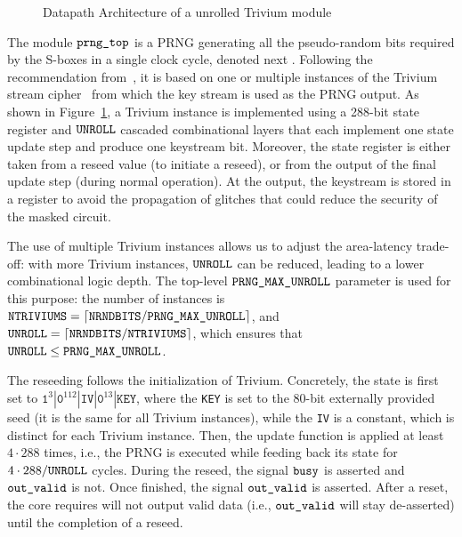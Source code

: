 \documentclass{scrartcl}
\begin{document}
\begin{figure}
    \centering
    \resizebox{\textwidth}{!}{
        \begin{tikzpicture}
            
        \end{tikzpicture}
    }
    \caption{Datapath Architecture of a unrolled Trivium module}
    \label{fig:prng}
\end{figure}


\label{subsection:PRNG}

The module $\texttt{prng\_top}$ is a PRNG generating all the pseudo-random bits
required by the S-boxes in a single clock cycle, denoted next \NRNDBITS.
Following the recommendation from~\cite{CiC-1-2-4}, it is based on one or
multiple instances of the Trivium stream
cipher~\cite{DBLP:series/lncs/CanniereP08} from which the key stream is used as
the PRNG output. As shown in Figure~\ref{fig:prng}, a Trivium instance is
implemented using a 288-bit state register and $\texttt{UNROLL}$ cascaded combinational
layers that each implement one state update step and produce one keystream bit.
Moreover, the state register is either taken from a reseed value (to initiate a
reseed), or from the output of the final update step (during normal operation).
At the output, the keystream is stored in a register to avoid the propagation
of glitches that could reduce the security of the masked circuit.

The use of multiple Trivium instances allows us to adjust the area-latency
trade-off: with more Trivium instances, $\texttt{UNROLL}$ can be reduced, leading to a
lower combinational logic depth.  The top-level $\texttt{PRNG\_MAX\_UNROLL}$ parameter is used
for this purpose: the number of instances is $\texttt{NTRIVIUMS} = \lceil \texttt{NRNDBITS} /
\texttt{PRNG\_MAX\_UNROLL} \rceil$, and $\texttt{UNROLL} = \lceil \texttt{NRNDBITS} / \texttt{NTRIVIUMS} \rceil$, which
ensures that $\texttt{UNROLL} \le \texttt{PRNG\_MAX\_UNROLL}$.

The reseeding follows the initialization of Trivium. Concretely, the state is
first set to
$\texttt{1}^3|\texttt{0}^{112}|\texttt{IV}|\texttt{0}^{13}|\texttt{KEY}$, where
the \texttt{KEY} is set to the 80-bit externally provided seed (it is
the same for all Trivium instances), while the \texttt{IV} is a constant, which
is distinct for each Trivium instance.  Then, the update function is applied at
least $4\cdot 288$ times, i.e., the PRNG is executed while feeding back its
state for $4\cdot 288 / \texttt{UNROLL}$ cycles.  During the reseed, the signal
$\texttt{busy}$ is asserted and $\texttt{out\_valid}$ is not. Once finished, the
signal $\texttt{out\_valid}$ is asserted.  After a reset, the core requires will
not output valid data (i.e., $\texttt{out\_valid}$ will stay de-asserted) until
the completion of a reseed.
  
\end{document}

